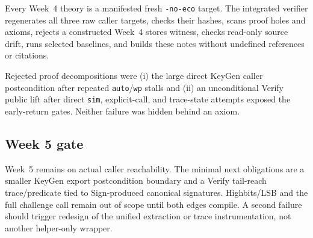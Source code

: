 Every Week~4 theory is a manifested fresh \texttt{-no-eco} target.  The
integrated verifier regenerates all three raw caller targets, checks their
hashes, scans proof holes and axioms, rejects a constructed Week~4 stores
witness, checks read-only source drift, runs selected baselines, and builds
these notes without undefined references or citations.

Rejected proof decompositions were (i) the large direct KeyGen caller
postcondition after repeated \texttt{auto}/\texttt{wp} stalls and (ii) an
unconditional Verify public lift after direct \texttt{sim}, explicit-call, and
trace-state attempts exposed the early-return gates.  Neither failure was
hidden behind an axiom.

\subsection{Week 5 gate}

Week~5 remains on actual caller reachability.  The minimal next obligations
are a smaller KeyGen export postcondition boundary and a Verify tail-reach
trace/predicate tied to Sign-produced canonical signatures.  Highbits/LSB and
the full challenge call remain out of scope until both edges compile.  A
second failure should trigger redesign of the unified extraction or trace
instrumentation, not another helper-only wrapper.
